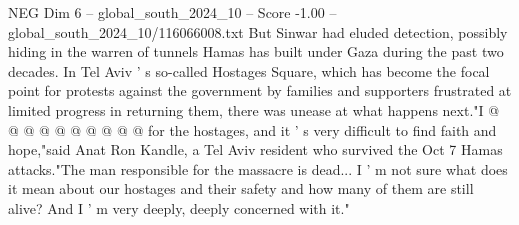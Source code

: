 \begin{textsample}{NEG Dim 6 – global\_south\_2024\_10 – Score -1.00 – global\_south\_2024\_10/116066008.txt}
But Sinwar had eluded detection, possibly hiding in the warren of tunnels Hamas has built under Gaza during the past two decades.
In Tel Aviv ' s so-called Hostages Square, which has become the focal point for protests against the government by families and supporters frustrated at limited progress in returning them, there was unease at what happens next."I @ @ @ @ @ @ @ @ @ @ for the hostages, and it ' s very difficult to find faith and hope,"said Anat Ron Kandle, a Tel Aviv resident who survived the Oct 7 Hamas attacks."The man responsible for the massacre is dead...
I ' m not sure what does it mean about our hostages and their safety and how many of them are still alive?
And I ' m very deeply, deeply concerned with it."

\end{textsample}
